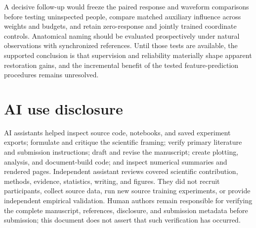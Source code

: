 \documentclass{article}
\begin{document}
A decisive follow-up would freeze the paired response and waveform comparisons before testing uninspected people, compare matched auxiliary influence across weights and budgets, and retain zero-response and jointly trained coordinate controls. Anatomical naming should be evaluated prospectively under natural observations with synchronized references. Until those tests are available, the supported conclusion is that supervision and reliability materially shape apparent restoration gains, and the incremental benefit of the tested feature-prediction procedures remains unresolved.

\label{maintextend}
\clearpage
\section*{AI use disclosure}
AI assistants helped inspect source code, notebooks, and saved experiment exports; formulate and critique the scientific framing; verify primary literature and submission instructions; draft and revise the manuscript; create plotting, analysis, and document-build code; and inspect numerical summaries and rendered pages. Independent assistant reviews covered scientific contribution, methods, evidence, statistics, writing, and figures. They did not recruit participants, collect source data, run new source training experiments, or provide independent empirical validation. Human authors remain responsible for verifying the complete manuscript, references, disclosure, and submission metadata before submission; this document does not assert that such verification has occurred.


\clearpage
\appendix

\end{document}
